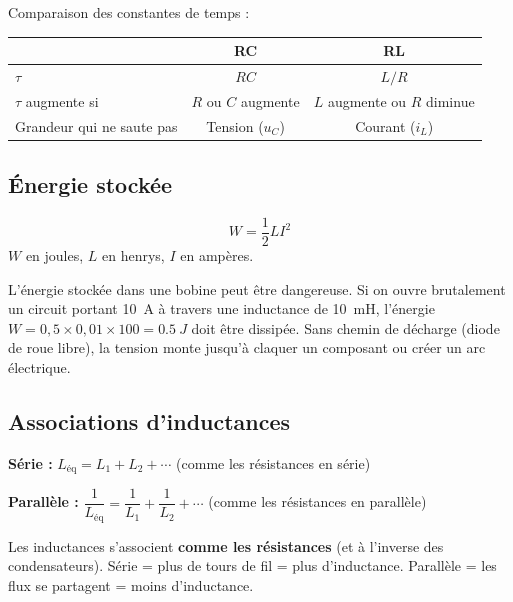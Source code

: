\documentclass[12pt,a4paper,twoside]{book}
\begin{document}
\begin{pratique}
Comparaison des constantes de temps :
\begin{center}
\begin{tabular}{lcc}
\toprule
 & \textbf{RC} & \textbf{RL} \\
\midrule
$\tau$ & $RC$ & $L/R$ \\
$\tau$ augmente si & $R$ ou $C$ augmente & $L$ augmente ou $R$ diminue \\
Grandeur qui ne saute pas & Tension ($u_C$) & Courant ($i_L$) \\
\bottomrule
\end{tabular}
\end{center}
\end{pratique}

\subsection{Énergie stockée}

\begin{formule}
\[
\boxed{W = \frac{1}{2}LI^2}
\]
$W$ en joules, $L$ en henrys, $I$ en ampères.
\end{formule}

\begin{attention}
L'énergie stockée dans une bobine peut être dangereuse. Si on ouvre brutalement un circuit portant \SI{10}{A} à travers une inductance de \SI{10}{mH}, l'énergie $W = 0{,}5 \times 0{,}01 \times 100 = \SI{0.5}{J}$ doit être dissipée. Sans chemin de décharge (diode de roue libre), la tension monte jusqu'à claquer un composant ou créer un arc électrique.
\end{attention}

\subsection{Associations d'inductances}

\begin{formule}
\textbf{Série :} $\boxed{L_{\text{éq}} = L_1 + L_2 + \cdots}$ \qquad (comme les résistances en série)

\textbf{Parallèle :} $\boxed{\dfrac{1}{L_{\text{éq}}} = \dfrac{1}{L_1} + \dfrac{1}{L_2} + \cdots}$ \qquad (comme les résistances en parallèle)
\end{formule}

\begin{intuition}
Les inductances s'associent \textbf{comme les résistances} (et à l'inverse des condensateurs). Série = plus de tours de fil = plus d'inductance. Parallèle = les flux se partagent = moins d'inductance.
\end{intuition}
\end{document}
